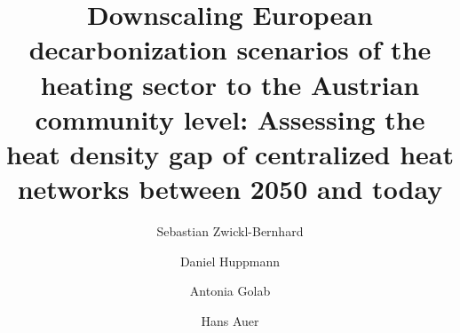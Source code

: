 \documentclass[review]{elsarticle}
\begin{document}
\begin{frontmatter}

\title{Downscaling European decarbonization scenarios of the heating sector to the Austrian community level: Assessing the heat density gap of centralized heat networks between 2050 and today}
\author[1,2]{Sebastian Zwickl-Bernhard}
\author[2]{Daniel Huppmann}
\author[1]{Antonia Golab}
\author[1]{Hans Auer}
\address[1]{Energy Economics Group (EEG), Technische Universität Wien, Gusshausstrasse 25-29/E370-3, 1040 Wien, Austria}
\address[2]{Energy, Climate and Environment (ECE) Program,  International Institute for Applied Systems Analysis (IIASA), Laxenburg, Austria}
\begin{abstract}
\end{abstract}

\begin{keyword}
\end{keyword}
\end{frontmatter}
\end{document}
